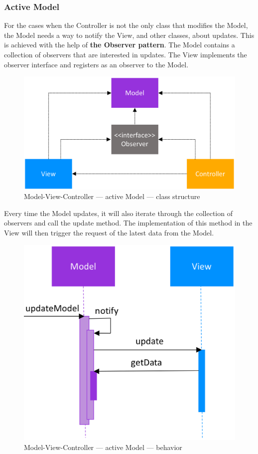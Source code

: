 \documentclass[a4paper,12pt]{ctexart}
\begin{document}
	\subsubsection{Active Model}
	For the cases when the Controller is not the only class that modifies the Model, the Model needs a way to notify the View, and other classes, about updates. This is achieved with the help of \textbf{the Observer pattern}. The Model contains a collection of observers that are interested in updates. The View implements the observer interface and registers as an observer to the Model.
	\begin{figure}[ht]
		\centering
		\includegraphics[width=\textwidth]{image/4.png}
		\caption{Model-View-Controller — active Model — class structure}
	\end{figure}
	Every time the Model updates, it will also iterate through the collection of observers and call the update method. The implementation of this method in the View will then trigger the request of the latest data from the Model.
	\begin{figure}[!h]
		\centering
		\includegraphics[width=\textwidth,height=0.8\textwidth]{image/5.png}
		\caption{Model-View-Controller — active Model — behavior}
	\end{figure}
\end{document}
